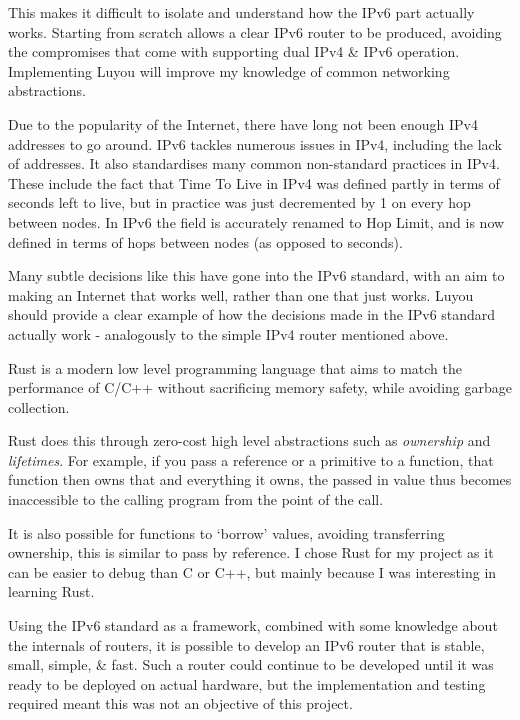 \documentclass[12pt,a4paper,twoside,openany]{report}
\begin{document}
This makes it difficult to isolate and understand how the IPv6 part actually works.  Starting from scratch allows a clear IPv6 router to be produced, avoiding the compromises that come with supporting dual IPv4 \& IPv6 operation.  Implementing Luyou will improve my knowledge of common networking abstractions.

\bigskip

Due to the popularity of the Internet, there have long not been enough IPv4\cite{ipv4_rfc} addresses to go around. IPv6 tackles numerous issues in IPv4, including the lack of addresses. It also standardises many common non-standard practices in IPv4. These include the fact that Time To Live in IPv4 was defined partly in terms of seconds left to live, but in practice was just decremented by 1 on every hop between nodes. In IPv6 the field is accurately renamed to Hop Limit, and is now defined in terms of hops between nodes (as opposed to seconds). 

Many subtle decisions like this have gone into the IPv6 standard, with an aim to making an Internet that works well, rather than one that just works. Luyou should provide a clear example of how the decisions made in the IPv6 standard actually work - analogously to the simple IPv4 router\cite{simple_router} mentioned above.

\bigskip

Rust\cite{rust} is a modern low level programming language that aims to match the performance of C/C++ without sacrificing memory safety, while avoiding garbage collection.

Rust does this through zero-cost high level abstractions such as \textit{ownership} and \textit{lifetimes}. For example, if you pass a reference or a primitive to a function, that function then owns that and everything it owns, the passed in value thus becomes inaccessible to the calling program from the point of the call. 

It is also possible for functions to `borrow' values, avoiding transferring ownership, this is similar to pass by reference.  I chose Rust for my project as it can be easier to debug than C or C++, but mainly because I was interesting in learning Rust.

\bigskip

Using the IPv6 standard as a framework, combined with some knowledge about the internals of routers, it is possible to develop an IPv6 router that is stable, small, simple, \& fast.  Such a router could continue to be developed until it was ready to be deployed on actual hardware, but the implementation and testing required meant this was not an objective of this project.  
\end{document}
